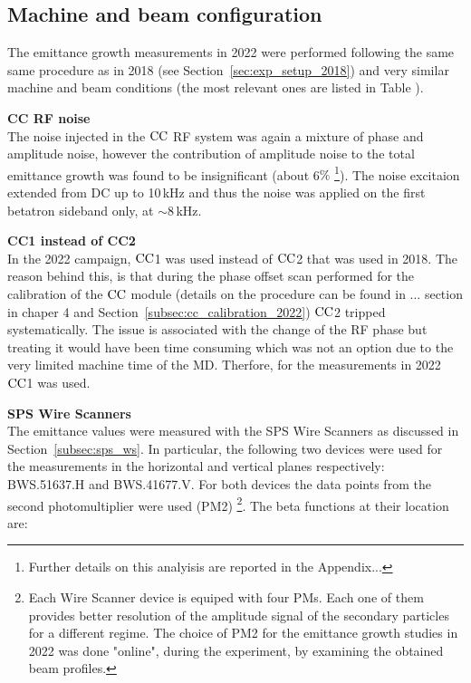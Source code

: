 \subsection{Machine and beam configuration}\label{sec:cc_md_2022_parameters}
The emittance growth measurements in 2022 were performed following the same same procedure as in 2018 (see Section~\ref{sec:exp_setup_2018}) and very similar machine and beam conditions (the most relevant ones are listed in Table ). 


\textbf{CC RF noise}\\
The noise injected in the ${\mathrm{CC}}$ RF system was again a mixture of phase and amplitude noise, however the contribution of amplitude noise to the total emittance growth was found to be insignificant (about 6$\%$ \footnote{Further details on this analyisis are reported in the Appendix...}). The noise excitaion extended from DC up to 10\,kHz and thus the noise was applied on the first betatron sideband only, at $\sim$8\,kHz.

\textbf{CC1 instead of CC2}\\
In the 2022 campaign, ${\mathrm{CC}}$1 was used instead of ${\mathrm{CC}}$2 that was used in 2018. The reason behind this, is that during the phase offset scan performed for the calibration of the ${\mathrm{CC}}$ module (details on the procedure can be found in ... section in chaper 4 and  Section~\ref{subsec:cc_calibration_2022}) ${\mathrm{CC}}$2 tripped systematically. The issue is associated with the change of the RF phase but treating it would have been time consuming which was not an option due to the very limited machine time of the MD. Therfore, for the measurements in 2022 ${\mathrm{CC}}$1 was used.

\textbf{SPS Wire Scanners}\\
The emittance values were measured with the SPS Wire Scanners as discussed in Section~\ref{subsec:sps_ws}. In particular, the following two devices were used for the measurements in the horizontal and vertical planes respectively: BWS.51637.H and BWS.41677.V. For both devices the data points from the second photomultiplier were used (PM2) \footnote{Each Wire Scanner device is equiped with four PMs. Each one of them provides better resolution of the amplitude signal of the secondary particles for a different regime. The choice of PM2 for the emittance growth studies in 2022 was done "online", during the experiment, by examining the obtained beam profiles.}. The beta functions at their location are: 

